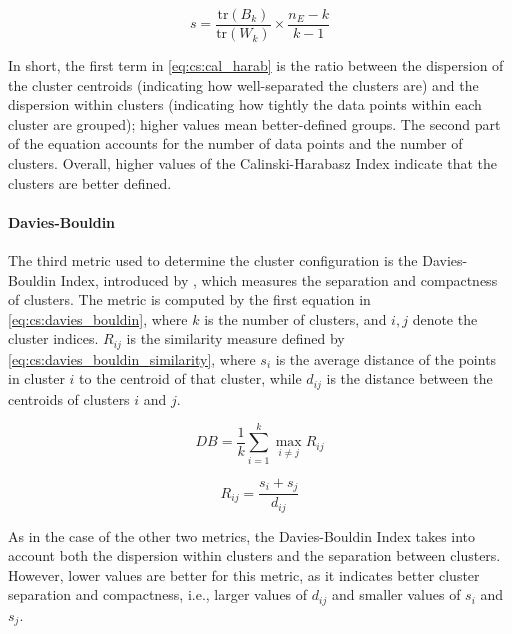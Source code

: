 \begin{equation} \label{eq:cs:cal_harab}
    s = \frac{\mathrm{tr}(B_k)}{\mathrm{tr}(W_k)} \times \frac{n_E - k}{k - 1}
\end{equation}

In short, the first term in \cref{eq:cs:cal_harab} is the ratio between the dispersion of the cluster centroids (indicating how well-separated the clusters are) and the dispersion within clusters (indicating how tightly the data points within each cluster are grouped); higher values mean better-defined groups. The second part of the equation accounts for the number of data points and the number of clusters. Overall, higher values of the Calinski-Harabasz Index indicate that the clusters are better defined.


\paragraph*{Davies-Bouldin} \label{s:lit:davies_bouldin}

The third metric used to determine the cluster configuration is the Davies-Bouldin Index, introduced by \citet{Davies1979-tn}, which measures the separation and compactness of clusters. The metric is computed by the first equation in \cref{eq:cs:davies_bouldin}, where \(k\) is the number of clusters, and \(i, j\) denote the cluster indices. \(R_{ij}\) is the similarity measure defined by \cref{eq:cs:davies_bouldin_similarity}, where \(s_i\) is the average distance of the points in cluster \(i\) to the centroid of that cluster, while \(d_{ij}\) is the distance between the centroids of clusters \(i\) and \(j\).

\begin{equation} \label{eq:cs:davies_bouldin}
    DB = \frac{1}{k} \sum_{i=1}^k \max_{i \neq j} R_{ij}
\end{equation}

\begin{equation} \label{eq:cs:davies_bouldin_similarity}
    R_{ij} = \frac{s_i + s_j}{d_{ij}}
\end{equation}

As in the case of the other two metrics, the Davies-Bouldin Index takes into account both the dispersion within clusters and the separation between clusters. However, lower values are better for this metric, as it indicates better cluster separation and compactness, i.e., larger values of \(d_{ij}\) and smaller values of \(s_i\) and \(s_j\).


